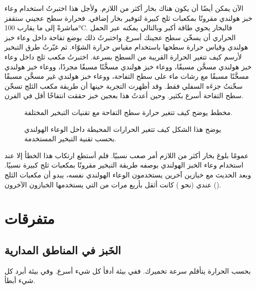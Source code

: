 الآن يمكن أيضًا أن يكون هناك بخار أكثر من اللازم. ولأجل هذا اختبرتُ استخدام وعاء خبز هولندي مقرونًا بمكعبات ثلج كبيرة لتوفير بخار إضافي. فحرارة سطح عجيني ستقفز مباشرةً إلى ما يقارب \textenglish{100°C}. فالبخار يحوي طاقة أكبر وبالتالي يمكنه عبر الحمل الحراري أن يسخّن سطح عجينك أسرع. واختبرتُ ذلك بوضع تفاحة داخل وعاء خبز هولندي وقياس حرارة سطحها باستخدام مقياس حرارة الشوّاء. ثم غيّرتُ طرق التبخير لأرسم كيف تتغير الحرارة القريبة من السطح بسرعة. اختبرتُ مكعب ثلج داخل وعاء خبز هولندي مسخَّن مسبقًا، ووعاء خبز هولندي مسخَّنًا مسبقًا مجردًا، ووعاء خبز هولندي مسخَّنًا مسبقًا مع رشات ماء على سطح التفاحة، ووعاء خبز هولندي غير مسخَّن مسبقًا سخّنتُ جزءَه السفلي فقط. وقد أظهرت التجربة حينها أن طريقة مكعب الثلج تسخّن سطح التفاحة أسرع بكثير. وحين أعدتُ هذا بعجين خبز حققت انتفاخًا أقل في الفرن.

\begin{figure}[!htb]
  \centering
  
  \caption[حرارة السطح مقابل تقنية التبخير] {مخطط يوضح كيف تتغير حرارة سطح التفاحة مع تقنيات التبخير المختلفة.}%
  \label{fig:apple-experiment-surface-temperatures}
\end{figure}

\begin{figure}[!htb]
  \centering
  
  \caption[حرارة الوعاء الهولندي مقابل تقنية التبخير] {يوضح هذا الشكل كيف تتغير الحرارات المحيطة داخل الوعاء الهولندي بحسب تقنية التبخير المستخدمة.}%
  \label{fig:apple-experiment-ambient-temperatures}
\end{figure}

عمومًا بلوغ بخار أكثر من اللازم أمر صعب نسبيًا. فلم أستطع ارتكاب هذا الخطأ إلا عند استخدام وعاء الخبز الهولندي بوصفه طريقة التبخير مقرونًا بمكعبات ثلج كبيرة نسبيًا. وبعد الحديث مع خبازين آخرين يستخدمون الوعاء الهولندي نفسه، يبدو أن مكعبات الثلج عندي (نحو ) كانت أثقل بأربع مرات من التي يستخدمها الخبازون الآخرون ().

\section{متفرقات}

\subsection{الخَبز في المناطق المدارية}

بحسب الحرارة يتأقلم سرعة تخميرك. ففي بيئة أدفأ كل شيء أسرع. وفي بيئة أبرد كل شيء أبطأ.

